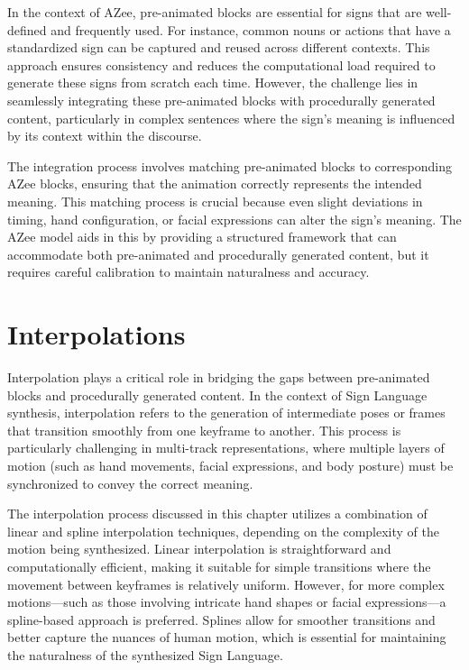 \documentclass[../../main.tex]{subfiles}
\begin{document}
In the context of AZee, pre-animated blocks are essential for signs that are well-defined and frequently used. For instance, common nouns or actions that have a standardized sign can be captured and reused across different contexts. This approach ensures consistency and reduces the computational load required to generate these signs from scratch each time. However, the challenge lies in seamlessly integrating these pre-animated blocks with procedurally generated content, particularly in complex sentences where the sign's meaning is influenced by its context within the discourse.

The integration process involves matching pre-animated blocks to corresponding AZee blocks, ensuring that the animation correctly represents the intended meaning. This matching process is crucial because even slight deviations in timing, hand configuration, or facial expressions can alter the sign's meaning. The AZee model aids in this by providing a structured framework that can accommodate both pre-animated and procedurally generated content, but it requires careful calibration to maintain naturalness and accuracy.

\section{Interpolations}

Interpolation plays a critical role in bridging the gaps between pre-animated blocks and procedurally generated content. In the context of Sign Language synthesis, interpolation refers to the generation of intermediate poses or frames that transition smoothly from one keyframe to another. This process is particularly challenging in multi-track representations, where multiple layers of motion (such as hand movements, facial expressions, and body posture) must be synchronized to convey the correct meaning.

The interpolation process discussed in this chapter utilizes a combination of linear and spline interpolation techniques, depending on the complexity of the motion being synthesized. Linear interpolation is straightforward and computationally efficient, making it suitable for simple transitions where the movement between keyframes is relatively uniform. However, for more complex motions—such as those involving intricate hand shapes or facial expressions—a spline-based approach is preferred. Splines allow for smoother transitions and better capture the nuances of human motion, which is essential for maintaining the naturalness of the synthesized Sign Language.
\end{document}
